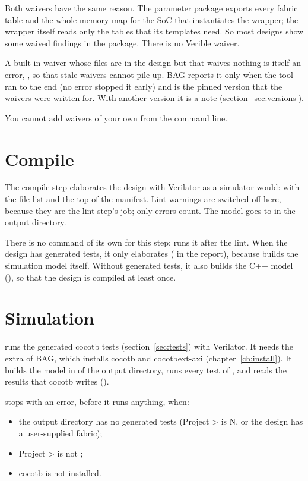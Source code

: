 Both waivers have the same reason. The parameter package exports every fabric table and
the whole memory map for the SoC that instantiates the wrapper; the wrapper itself reads
only the tables that its templates need. So most designs show some waived findings in
the package. There is no Verible waiver.

A built-in waiver whose files are in the design but that waives nothing is itself an
error, , so that stale waivers cannot pile up. BAG reports it only when the tool ran to the end (no
error stopped it early) and is the pinned version that the waivers were written for.
With another version it is a note (section~\ref{sec:versions}).

You cannot add waivers of your own from the command line.

\section{Compile}
\label{sec:compile}

The compile step elaborates the design with Verilator as a simulator would:  with the file list and the top of the manifest. Lint warnings are switched off here,
because they are the lint step's job; only errors count. The model goes to
 in the output directory.

There is no command of its own for this step:  runs it after the lint. When
the design has generated tests, it only elaborates ( in the
report), because  builds the simulation model itself. Without generated
tests, it also builds the C++ model (), so that the design is
compiled at least once.

\section{Simulation}
\label{sec:sim}

 runs the generated cocotb tests (section~\ref{sec:tests}) with Verilator. It
needs the  extra of BAG, which installs cocotb and cocotbext-axi
(chapter~\ref{ch:install}). It builds the model in  of the output directory,
runs every test of , and reads the results that cocotb
writes ().

 stops with an error, before it runs anything, when:

\begin{itemize}
\item the output directory has no generated tests (Project >  is N, or the design has a user-supplied fabric);
\item Project >  is not ;
\item cocotb is not installed.
\end{itemize}

